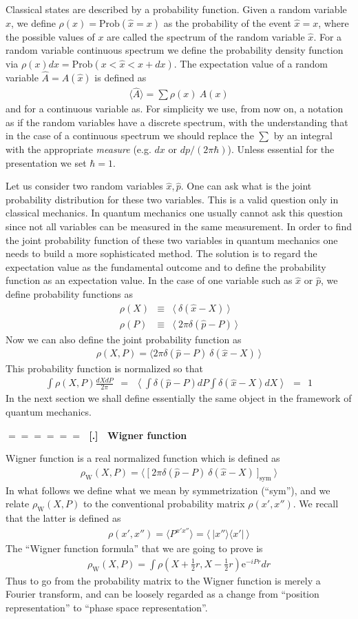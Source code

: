 \documentclass[onecolumn,fleqn]{revtex4}
\newcommand{\eexp}{\mathrm{e}^}
\newcommand{\tbox}[1]{\text{#1}}
\newcommand{\beq}{\begin{eqnarray}}
\newcommand{\eeq}{\end{eqnarray}}
\renewcommand{\thesubsection}{\arabic{subsection}}
\renewcommand{\thesubsubsection}{\arabic{subsubsection}}
\newcommand{\sheadC}[1]
{
\addtocounter{subsubsection}{1}
\vspace{5mm}
{\Large\bf $=\!=\!=\!=\!=\!=\;$ [\thesubsection.\thesubsubsection] \ #1}  
\nopagebreak
\phantomsection
}
\begin{document}
Classical states are described by a probability function.
Given a random variable $\hat{x}$, we define $\rho(x) = \mathrm{Prob}(\hat{x}=x)$ 
as the probability of the event ${ \hat{x} = x }$,  
where the possible values of $x$ are called the spectrum 
of the random variable $\hat{x}$. 
For a random variable continuous spectrum we 
define the  probability density function 
via ${\rho(x)dx =\mathrm{Prob}( x < \hat{x}< x+dx)}$. 
The expectation value of a random variable $\hat{A}=A(\hat{x})$ 
is defined as  
\beq
\langle\hat{A}\rangle = \sum{ \rho(x) \ A(x) }
\eeq
and for a continuous variable as. 
For simplicity we use, from now on, a notation 
as if the random variables have a discrete spectrum, 
with the understanding that in the case of a continuous 
spectrum we should replace the $\sum$ by an integral with 
the appropriate {\em measure} (e.g. $dx$ or $dp/(2\pi\hbar)$).  
Unless essential for the presentation we set ${\hbar=1}$. 


Let us consider two random variables ${ \hat{x}, \hat{p} }$.
One can ask what is the joint probability distribution 
for these two variables.  This is a valid question only in classical
mechanics.  In quantum mechanics one usually cannot ask this question
since not all variables can be measured in the same measurement.  
In order to find the joint probability function of these two variables
in quantum mechanics one needs to build a more sophisticated method.
The solution is to regard the expectation value as the fundamental
outcome and to define the probability function as an expectation value.
In the case of one variable such as $\hat{x}$ or $\hat{p}$, we define
probability functions as
\beq
\rho(X) &\equiv& \langle \ \delta(\hat{x}-X) \ \rangle 
\\ \nonumber
\rho(P) &\equiv& \langle \ 2\pi\delta(\hat{p}-P) \ \rangle
\eeq
Now we can also define the joint probability function as
\beq
\rho(X,P) = \langle 2\pi\delta(\hat{p}-P) \ \delta(\hat{x}-X) \ \rangle
\eeq
This probability function is normalized so that
\beq
\int \rho(X,P)\frac{dX dP}{2\pi} 
\ \ = \ \ \left\langle\int{\delta(\hat{p}-P)dP}\int{\delta(\hat{x}-X)dX}\right\rangle
\ \ = \ \ 1
\eeq
In the next section we shall define essentially the same object 
in the framework of quantum mechanics.




\sheadC{Wigner function}

Wigner function is a real normalized function which is defined as
\beq
\rho_{\tbox{W}}(X,P)
=\Big\langle \ \Big[ 
\ 2\pi\delta(\hat{p}-P) \ \delta(\hat{x}-X) \ 
\Big]_{\tbox{sym}} \ \Big\rangle
\eeq
In what follows we define what we mean 
by symmetrization (``sym''), and we 
relate $\rho_{\tbox{W}}(X,P)$ to the conventional 
probability matrix $\rho(x',x'')$.  
We recall that the latter is defined as
\beq
\rho(x',x'')
=\Big\langle P^{x'x''}\Big\rangle
=\Big\langle \ |x''\rangle\langle x'| \ \Big\rangle
\eeq
The ``Wigner function formula'' that we are going to prove is 
\beq
\rho_{\tbox{W}}(X,P) = \int  \rho\left( X+\frac{1}{2}r, X-\frac{1}{2}r \right) \eexp{-iPr} dr
\eeq
Thus to go from the probability matrix to the Wigner function 
is merely a Fourier transform, and can be loosely regarded 
as a change from ``position representation'' to ``phase space representation''.     
\end{document}
